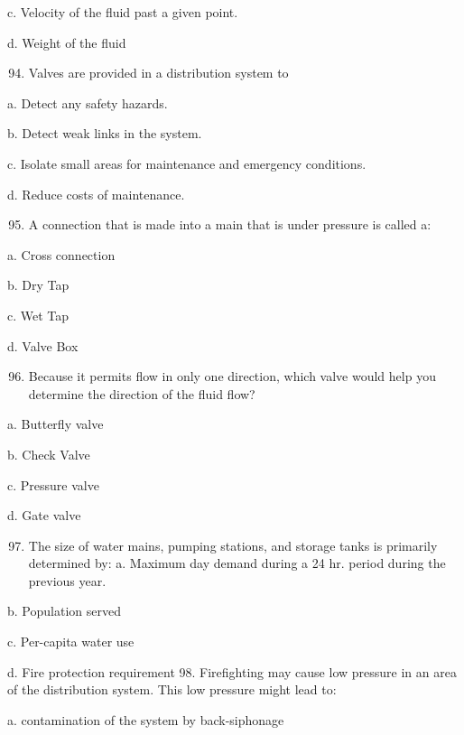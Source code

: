 \documentclass[10pt]{article}
\begin{document}
\begin{enumerate}
\begin{enumerate}
c. Velocity of the fluid past a given point.

d. Weight of the fluid

\begin{enumerate}
  \setcounter{enumi}{93}
  \item Valves are provided in a distribution system to
\end{enumerate}

a. Detect any safety hazards.

b. Detect weak links in the system.

c. Isolate small areas for maintenance and emergency conditions.

d. Reduce costs of maintenance.

\begin{enumerate}
  \setcounter{enumi}{94}
  \item A connection that is made into a main that is under pressure is called a:
\end{enumerate}

a. Cross connection

b. Dry Tap

c. Wet Tap

d. Valve Box

\begin{enumerate}
  \setcounter{enumi}{95}
  \item Because it permits flow in only one direction, which valve would help you determine the direction of the fluid flow?
\end{enumerate}

a. Butterfly valve

b. Check Valve

c. Pressure valve

d. Gate valve

\begin{enumerate}
  \setcounter{enumi}{96}
  \item The size of water mains, pumping stations, and storage tanks is primarily determined by: a. Maximum day demand during a 24 hr. period during the previous year.
\end{enumerate}

b. Population served

c. Per-capita water use

d. Fire protection requirement 98. Firefighting may cause low pressure in an area of the distribution system. This low pressure might lead to:

a. contamination of the system by back-siphonage


\end{enumerate}
\end{enumerate}
\end{document}
